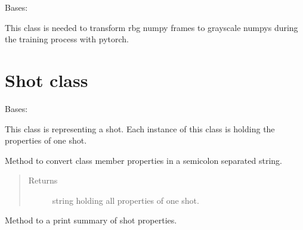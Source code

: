 \documentclass[letterpaper,10pt,english,openany,oneside]{sphinxmanual}
\begin{document}
\begin{fulllineitems}
\label{\detokenize{CustomTransforms:stc.CustomTransforms.ToGrayScale}}
Bases: 

This class is needed to transform rbg numpy frames to grayscale numpys during the training process with pytorch.

\end{fulllineitems}



\section{Shot class}
\label{\detokenize{Shot:shot-class}}\label{\detokenize{Shot::doc}}

\begin{fulllineitems}
\label{\detokenize{Shot:stc.Shot.Shot}}
Bases: 

This class is representing a shot. Each instance of this class is holding the properties of one shot.

\begin{fulllineitems}
\label{\detokenize{Shot:stc.Shot.Shot.convert2String}}
Method to convert class member properties in a semicolon separated string.
\begin{quote}\begin{description}
\item[{Returns}] \leavevmode
string holding all properties of one shot.

\end{description}\end{quote}

\end{fulllineitems}


\begin{fulllineitems}
\label{\detokenize{Shot:stc.Shot.Shot.printShotInfo}}
Method to a print summary of shot properties.

\end{fulllineitems}


\end{fulllineitems}
\end{document}
